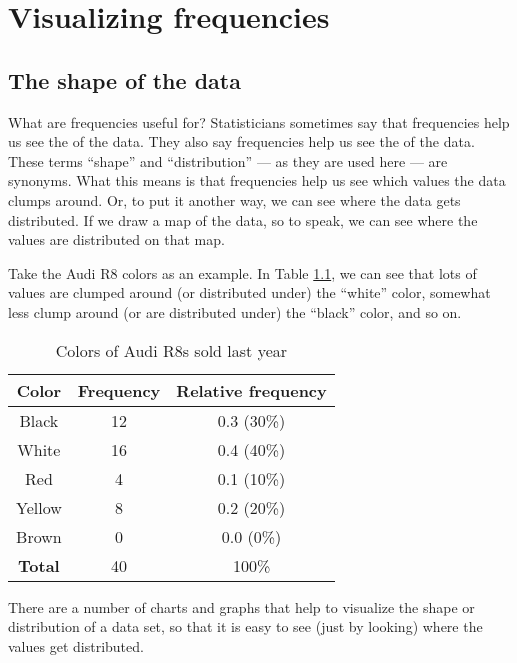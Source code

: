 \documentclass[../../../main.tex]{subfiles}
\begin{document}
\chapter{Visualizing frequencies}


\section{The shape of the data}

What are frequencies useful for? Statisticians sometimes say that frequencies help us see the  of the data. They also say frequencies help us see the  of the data. These terms ``shape'' and ``distribution'' --- as they are used here --- are synonyms. What this means is that frequencies help us see which values the data clumps around. Or, to put it another way, we can see where the data gets distributed. If we draw a map of the data, so to speak, we can see where the values are distributed on that map. 

Take the Audi R8 colors as an example. In Table \ref{table:R8 colors}, we can see that lots of values are clumped around (or distributed under) the ``white'' color, somewhat less clump around (or are distributed under) the ``black'' color, and so on.

\begin{table}[ht]
  \begin{tabular}{| c | c | c |}
    \hline
    \textbf{Color} & \textbf{Frequency} & \textbf{Relative frequency} \\
    \hline
    Black & 12 & 0.3 (30\%) \\
    \hline
    White & 16 & 0.4 (40\%) \\
    \hline
    Red & 4 & 0.1 (10\%) \\
    \hline
    Yellow & 8 & 0.2 (20\%) \\
    \hline
    Brown & 0 & 0.0 (0\%) \\
    \hline
    \textbf{Total} & 40 & 100\% \\
    \hline
  \end{tabular}
  \caption{\label{table:R8 colors} Colors of Audi R8s sold last year}
\end{table}

There are a number of charts and graphs that help to visualize the shape or distribution of a data set, so that it is easy to see (just by looking) where the values get distributed.
\end{document}
